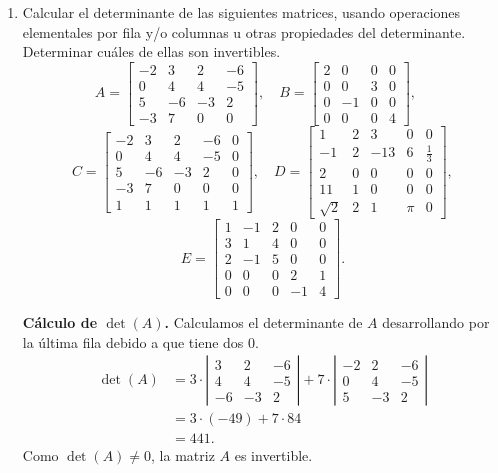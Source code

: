 \begin{enumerate}[topsep=6pt,itemsep=.4cm]
    
    \item Calcular el determinante de las siguientes matrices, usando operaciones elementales por fila y/o columnas u otras propiedades del determinante. Determinar cuáles de ellas son invertibles.
    \begin{equation*}
    A=
    \begin{bmatrix}-2&3&2&-6\\ 0&4&4&-5\\ 5&-6&-3&2\\ -3&7&0&0 \end{bmatrix},\quad
    B=\begin{bmatrix} 2&0&0&0\\ 0&0&3&0\\ 0&-1&0&0\\ 0&0&0&4\end{bmatrix},\quad
    \end{equation*}
    \begin{equation*}
        C=\begin{bmatrix} -2&3&2&-6&0\\ 0&4&4&-5&0\\ 5&-6&-3&2&0\\ -3&7&0&0&0\\ 1&1&1&1&1\end{bmatrix},\quad
    D=\begin{bmatrix}1&2&3&0&0\\-1&2&-13&6&\frac{1}{3}\\2&0&0&0&0\\11&1&0&0&0\\\sqrt{2}&2&1&\pi&0\end{bmatrix},
    \end{equation*}
    \begin{equation*}
    E=\begin{bmatrix}1&-1&2&0&0\\ 3&1&4&0&0\\ 2&-1&5&0&0 \\0&0&0&2&1\\ 0&0&0&-1&4    \end{bmatrix}.
    \end{equation*}
    \rta

    \textbf{Cálculo de $\det(A)$.} Calculamos el determinante de $A$ desarrollando por la última fila debido a que tiene dos   $0$. 
    \begin{align*}
        \det(A) &= 3\cdot \left|\begin{matrix} 3&2&-6\\ 4&4&-5\\ -6&-3&2\end{matrix}\right| + 7\cdot \left|\begin{matrix} -2&2&-6\\ 0&4&-5\\ 5&-3&2\end{matrix}\right|\\
        &= 3\cdot (-49) + 7\cdot  84\\
        &= 441.
    \end{align*}
    Como $\det(A) \ne 0$, la matriz $A$ es invertible.



\end{enumerate}
